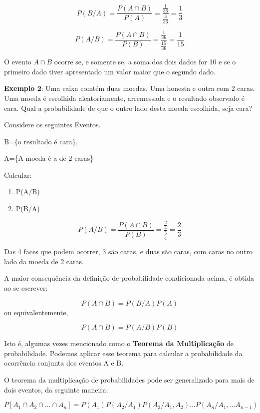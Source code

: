 $$P(B/A)=\frac{P(A \cap
B)}{P(A)}=\frac{\frac{1}{36}}{\frac{3}{36}} = \frac{1}{3}$$


$$P(A/B)=\frac{P(A \cap
B)}{P(B)}=\frac{\frac{1}{36}}{\frac{15}{36}} = \frac{1}{15}$$

O evento $A \cap B$ ocorre se, e somente se, a soma dos dois dados
for 10 e se o primeiro dado tiver apresentado um valor maior que o
segundo dado.\vskip0.3cm


\textbf{Exemplo 2}: Uma caixa comtém duas moedas. Uma honesta e
outra com 2 caras. Uma moeda é escolhida aleatoriamente,
arremessada e o resultado observado é cara. Qual a probabilidade
de que o outro lado desta moeda escolhida, seja cara?\vskip0.3cm

Considere os seguintes Eventos.\vskip0.3cm

B=\{o resultado é cara\}.

A=\{A moeda é a de 2 caras\}

\vskip0.3cm

Calcular:

\begin{enumerate}
    \item P(A/B)
    \item P(B/A)
\end{enumerate}


$$P(A/B)=\frac{P(A \cap
B)}{P(B)}=\frac{\frac{2}{4}}{\frac{3}{4}} = \frac{2}{3}$$

Das 4 faces que podem ocorrer, 3 são caras, e duas são caras, com
caras no outro lado da moeda de 2 caras.\vskip0.3cm


A maior consequência da definição de probabilidade condicionada
acima, é obtida ao se escrever:


$$
P(A \cap B)= P(B/A)P(A)
$$
 ou equivalentemente,

$$
P(A \cap B)= P(A/B)P(B)
$$

Isto é, algumas vezes mencionado como o \textbf{Teorema da
Multiplicação} de probabilidade. Podemos aplicar esse teorema para
calcular a probabilidade da ocorrência conjunta dos eventos A e B.
\vskip0.3cm

O teorema da multiplicação de probabilidades pode ser generalizado
para mais de dois eventos, da seguinte maneira:

\begin{equation}\label{}
    P[A_{1} \cap A_{2} \cap ... \cap A_{n}]=
    P(A_{1})P(A_{2}/A_{1})P(A_{3}/A_{1},A_{2})...P(A_{n}/A_{1},...A_{n-1})
\end{equation}

